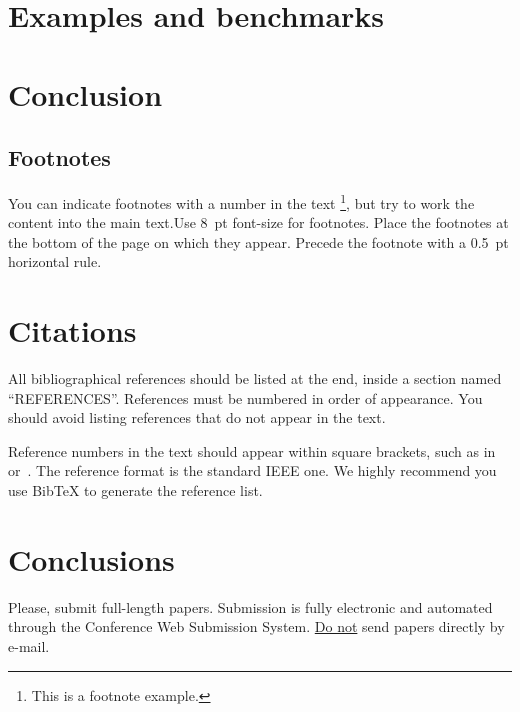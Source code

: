 \documentclass{article}
\begin{document}
\section{Examples and benchmarks}
\label{sec:examples_and_benchmarks}

\section{Conclusion}
\label{sec:conclusion}


\subsection{Footnotes}
You can indicate footnotes with a number in the text \footnote{This is a footnote example.},
but try to work the content into the main text.Use 8~pt font-size for footnotes.  Place the footnotes at the bottom of the page
on which they appear. Precede the footnote with a 0.5~pt horizontal rule.

\section{Citations}
All bibliographical references should be listed at the end, inside a section named ``REFERENCES''. References must be numbered in order of appearance. You should avoid listing references that do not appear in the text.

Reference numbers in the text should appear within square brackets, such as in~\cite{Someone:00} or~\cite{Someone:00,Someone:04,Someone:09}. The reference format is the standard IEEE one. We highly recommend you use BibTeX
to generate the reference list.

\section{Conclusions}
Please, submit full-length papers. Submission is fully electronic and automated through the Conference Web Submission System. \underline{Do not} send papers directly by e-mail.



\end{document}
